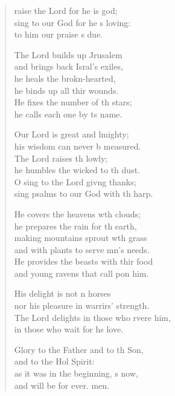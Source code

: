 \settowidth{\versewidth}{The Lord delights in those who revere him, *}
\begin{verse}%
  \begin{patverse}
raise the Lord for he is god;\Flex\\
sing to our God for he \pointup{\i}s loving:\Med\\
to him our praise \pointup{\i}s due.

The Lord builds up Jrusalem\Med\\
and brings back Isral’s exiles,\\
he heals the brokn-hearted,\Med\\
he binds up all thir wounds.\\
He fixes the number of th stars;\Med\\
he calls each one by \pointup{\i}ts name.

Our Lord is great and lmighty;\Med\\
his wisdom can never b measured.\\
The Lord raises th lowly;\Med\\
he humbles the wicked to th dust.\\
O sing to the Lord giv\pointup{\i}ng thanks;\Med\\
sing psalms to our God with th harp.

He covers the heavens w\pointup{\i}th clouds;\Med\\
he prepares the rain for th earth,\\
making mountains sprout w\pointup{\i}th grass\Med\\
and with plants to serve mn’s needs.\\
He provides the beasts with thir food\Med\\
and young ravens that call pon him.

His delight is not \pointup{\i}n horses\Med\\
nor his pleasure in warrirs’ strength.\\
The Lord delights in those who rvere him,\Med\\
in those who wait for h\pointup{\i}s love.

Glory to the Father and to th Son,\Med\\
and to the Hol Spirit:\\
as it was in the beginning, \pointup{\i}s now,\Med\\
and will be for ever. men.
  \end{patverse}
  \end{verse}
